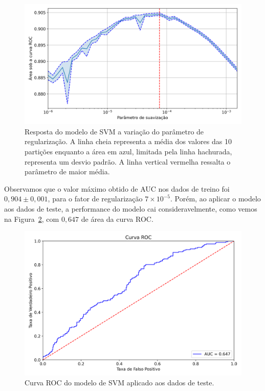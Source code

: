 \begin{figure}[h!]
\begin{center} {
    \begin{center}
    \includegraphics[scale=0.65]{images/svm_grid.png}
    \caption{Resposta do modelo de SVM a variação do parâmetro de regularização.
             A linha cheia representa a média dos valores das 10 partições
             enquanto a área em azul, limitada pela linha hachurada, representa um desvio padrão.
             A linha vertical vermelha ressalta o parâmetro de maior média.}
    \label{fig:svm_grid}
    \end{center}
}
\end{center}
\end{figure}

Observamos que o valor máximo obtido de AUC nos dados de treino foi
$0,904 \pm 0,001$, para o fator de regularização $7\times10^{-5}$.
Porém, ao aplicar o modelo aos dados de teste, a performance do modelo cai
consideravelmente, como vemos na Figura~\ref{fig:svm_roc}, com $0,647$ de área
da curva ROC.

\begin{figure}[h!]
\begin{center} {
    \begin{center}
    \includegraphics[scale=0.65]{images/svm_roc.png}
    \caption{Curva ROC do modelo de SVM aplicado aos dados de teste.}
    \label{fig:svm_roc}
    \end{center}
}
\end{center}
\end{figure}

